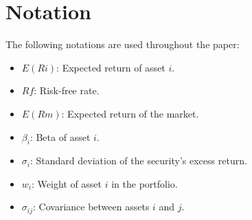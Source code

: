 \section{Notation}

The following notations are used throughout the paper:
\begin{itemize}
    \item $E(Ri)$: Expected return of asset $i$.
    \item $Rf$: Risk-free rate.
    \item $E(Rm)$: Expected return of the market.
    \item $\beta_i$: Beta of asset $i$.
    \item $\sigma_i$: Standard deviation of the security’s excess return.
    \item $w_i$: Weight of asset $i$ in the portfolio.
    \item $\sigma_{ij}$: Covariance between assets $i$ and $j$.
\end{itemize}

\newpage
